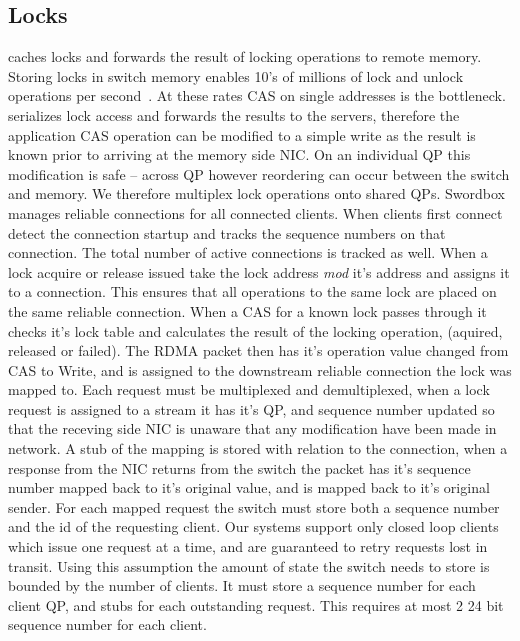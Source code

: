 \subsection{Locks}

\sword caches locks and forwards the result of locking
operations to remote memory. Storing locks in switch memory
enables 10's of millions of lock and unlock operations per
second~\cite{netlock}. At these rates CAS on single
addresses is the bottleneck. \sword serializes lock
access and forwards the results to the servers, therefore
the application CAS operation can be modified to a simple
write as the result is known prior to arriving at the memory
side NIC. On an individual QP this modification is safe --
across QP however reordering can occur between the switch
and memory. We therefore multiplex lock operations onto
shared QPs.
Swordbox manages reliable connections for all connected
clients. When clients first connect \sword detect the
connection startup and tracks the sequence numbers on that
connection. The total number of active connections is
tracked as well. When a lock acquire or release issued \sword
take the lock address \textit{mod} it's address and assigns
it to a connection. This ensures that all operations to the
same lock are placed on the same reliable connection.
When a CAS for a known lock passes through \sword it checks
it's lock table and calculates the result of the locking
operation, (aquired, released or failed). The RDMA packet
then has it's operation value changed from CAS to Write, and
is assigned to the downstream reliable connection the lock
was mapped to. Each request must be multiplexed and
demultiplexed, when a lock request is assigned to a stream
it has it's QP, and sequence number updated so that the
receving side NIC is unaware that any modification have been
made in network. A stub of the mapping is stored with
relation to the connection, when a response from the NIC
returns from the switch the packet has it's sequence number
mapped back to it's original value, and is mapped back to
it's original sender. For each mapped request the switch
must store both a sequence number and the id of the
requesting client. 
Our systems support only closed loop clients which issue one
request at a time, and are guaranteed to retry requests lost
in transit. Using this assumption the amount of state the
switch needs to store is bounded by the number of clients.
It must store a sequence number for each client QP, and
stubs for each outstanding request. This requires at most 2
24 bit sequence number for each client.

